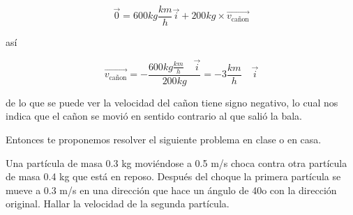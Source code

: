 \begin{tcolorbox}
\begin{equation*}
\vec{0} = 600 kg\frac{km}{h} \vec{i}+ 200kg\times \vec{v_{\text{cañon}}}
\end{equation*}

así

\begin{equation}
\vec{v_{\text{cañon}}}= -\frac{600 kg\frac{km}{h}\quad \vec{i}}{200 kg}= -3 \frac{km}{h}\quad \vec{i}
\end{equation}

de lo que se puede ver la velocidad del cañon tiene signo negativo, lo cual nos indica que el cañon se movió en sentido contrario al que salió la bala.

\end{tcolorbox}
\vspace{0.2cm}

Entonces te proponemos resolver el siguiente problema en clase o en casa.

\vspace{0.5cm}
\begin{tcolorbox}
Una partícula de masa 0.3 kg moviéndose a 0.5 m/s choca contra otra partícula de masa 0.4 kg que está en reposo. Después del choque la primera partícula se mueve a 0.3 m/s en una dirección que hace un  ángulo de 40o con la dirección original. Hallar la velocidad de la segunda partícula.
\end{tcolorbox}
